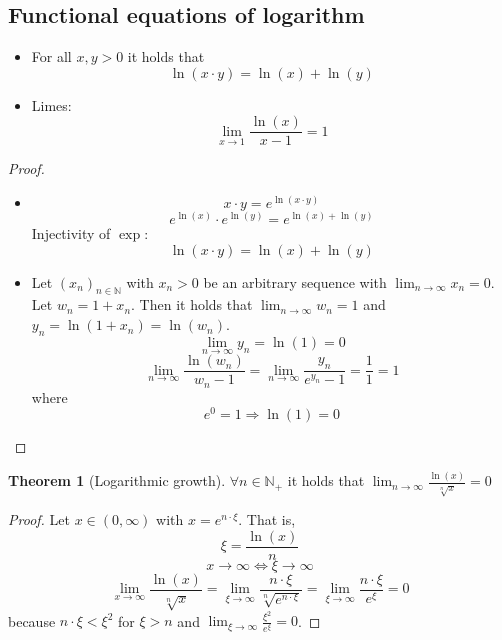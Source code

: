 \documentclass[a4paper,landscape,twocolumn]{article}
\theoremstyle{definition}
\newtheorem{theorem}{Theorem}
\begin{document}
\subsection{Functional equations of logarithm}
%
\begin{itemize}
  \item
    For all $x,y > 0$ it holds that
    \[ \ln(x \cdot y) = \ln(x) + \ln(y) \]
  \item Limes:
    \[ \lim_{x \to 1} \frac{\ln(x)}{x - 1} = 1 \]
\end{itemize}
\begin{proof}
  \begin{itemize}
    \item
      \[ x \cdot y = e^{\ln(x \cdot y)} \]
      \[ e^{\ln(x)} \cdot e^{\ln(y)} = e^{\ln(x) + \ln(y)} \]
      Injectivity of $\exp$:
      \[ \ln(x \cdot y) = \ln(x) + \ln(y) \]
    \item
      Let $(x_n)_{n\in\mathbb N}$ with $x_n > 0$ be an arbitrary
      sequence with $\lim_{n\to\infty} x_n = 0$.
      Let $w_n = 1 + x_n$. Then it holds that
      $\lim_{n\to\infty} w_n = 1$ and $y_n = \ln(1 + x_n) = \ln(w_n)$.
      \[ \lim_{n\to\infty} y_n = \ln(1) = 0 \]
      \[ \lim_{n\to\infty} \frac{\ln(w_n)}{w_n - 1} = \lim_{n\to\infty} \frac{y_n}{e^{y_n} - 1} = \frac11 = 1 \]
      where
      \[ e^0 = 1 \Rightarrow \ln(1) = 0 \]
  \end{itemize}
\end{proof}

\begin{theorem}[Logarithmic growth]
  $\forall n \in \mathbb N_+$ it holds that $\lim_{n\to\infty} \frac{\ln(x)}{\sqrt[n]{x}} = 0$
\end{theorem}
\begin{proof}
  Let $x \in (0,\infty)$ with $x = e^{n\cdot\xi}$. That is,
  \[ \xi = \frac{\ln(x)}{n} \]
  \[ x \to \infty \Leftrightarrow \xi \to \infty \]
  \[
    \lim_{x\to\infty} \frac{\ln(x)}{\sqrt[n]{x}}
    = \lim_{\xi\to\infty} \frac{n \cdot \xi}{\sqrt[n]{e^{n \cdot \xi}}}
    = \lim_{\xi\to\infty} \frac{n \cdot \xi}{e^\xi} = 0
  \]
  because $n \cdot \xi < \xi^2$ for $\xi > n$ and $\lim_{\xi\to\infty} \frac{\xi^2}{e^\xi} = 0$.
\end{proof}
\end{document}
